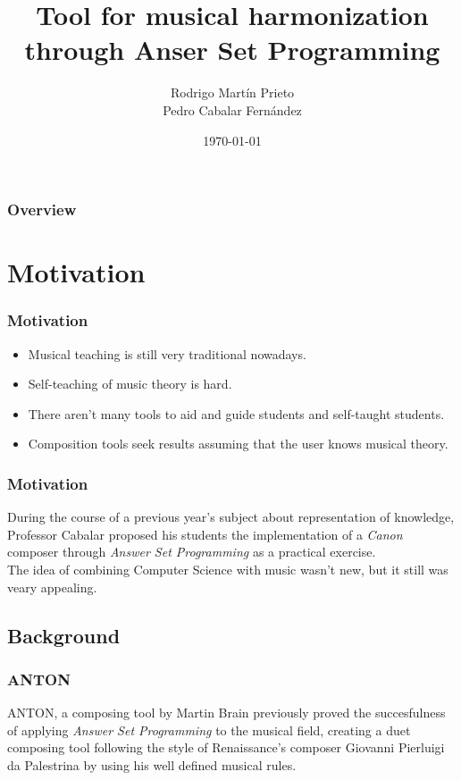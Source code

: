 \documentclass[english]{beamer}
\title[haspie]{Tool for musical harmonization through Anser Set Programming}
\author{Rodrigo Martín Prieto \\ Pedro Cabalar Fernández}
\institute[UDC] {
Universidade da Coruña \\ %
\medskip
\textit{r.martin@udc.es} %
}
\date{\today} %
\begin{document}
\begin{frame}
\titlepage %
\end{frame}

\begin{frame}
\frametitle{Overview}
\tableofcontents 
\end{frame}


\section{Motivation}
\begin{frame}
	\frametitle{Motivation}
	\begin{itemize}
			\item Musical teaching is still very traditional nowadays.
			\item Self-teaching of music theory is hard.
			\item There aren't many tools to aid and guide students and self-taught students.
			\item Composition tools seek results assuming that the user knows musical theory.
	\end{itemize}
\end{frame}
\begin{frame}
	\frametitle{Motivation}
	During the course of a previous year's subject about representation of knowledge, Professor Cabalar proposed his students the implementation of a \textit{Canon} composer through \textit{Answer Set Programming} as a practical exercise. \\
	
	The idea of combining Computer Science with music wasn't new, but it still was veary appealing.
\end{frame}

\subsection{Background}
\begin{frame}
	\frametitle{ANTON}
	ANTON, a composing tool by Martin Brain previously proved the succesfulness of applying \textit{Answer Set Programming} to the musical field, creating a duet composing tool following the style of Renaissance's composer Giovanni Pierluigi da Palestrina by using his well defined musical rules.
\end{frame}
\end{document}

